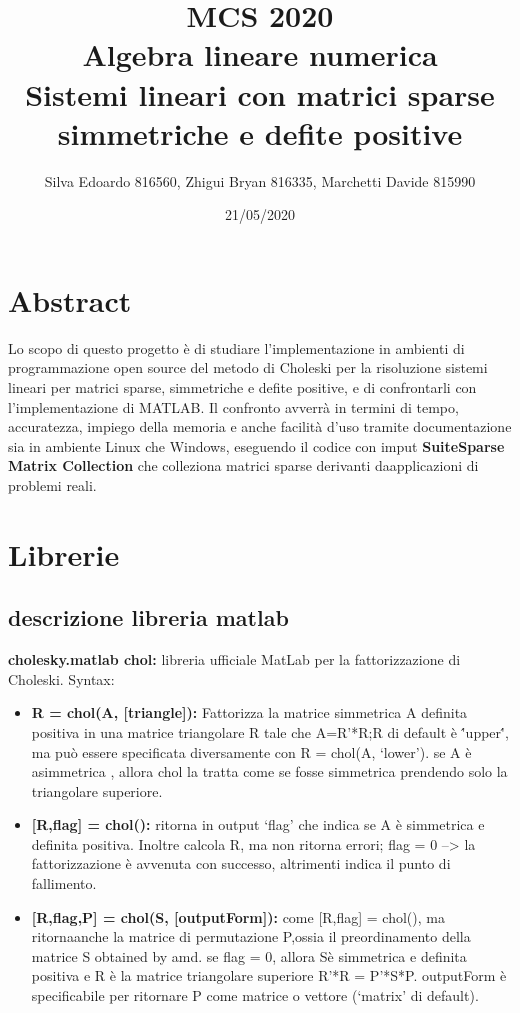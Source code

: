 \documentclass[12pt]{article}
\title{%
  MCS 2020 \\
  \large Algebra lineare numerica \\
  Sistemi lineari con matrici sparse simmetriche e defite positive}
\date{21/05/2020}
\author{Silva Edoardo 816560, Zhigui Bryan 816335, Marchetti Davide 815990}
\begin{document}
\maketitle

\section*{Abstract}

Lo scopo di questo progetto è di studiare l'implementazione in ambienti
di programmazione open source del metodo di Choleski per la risoluzione sistemi lineari
per matrici sparse, simmetriche e defite positive, e di confrontarli con l'implementazione
di MATLAB.\newline
Il confronto avverrà in termini di tempo, accuratezza, impiego della memoria e anche facilità d'uso tramite
documentazione sia in ambiente Linux che Windows, eseguendo il codice con imput \textbf{SuiteSparse Matrix Collection}
che colleziona matrici sparse derivanti daapplicazioni di problemi reali.\newline
\section{Librerie}
	\subsection{descrizione libreria matlab}
	
	\textbf{cholesky.matlab chol:} libreria ufficiale MatLab per la fattorizzazione di Choleski.	\newline
	 \large{Syntax:}
	\begin{itemize}
 		 \item \textbf{R = chol(A, [triangle]):} Fattorizza la matrice simmetrica A definita positiva in una matrice triangolare R tale che A=R'*R;\newline R di default è \''upper\'', ma può essere specificata diversamente con R = chol(A, `lower'). se A è asimmetrica , allora chol la tratta come se fosse simmetrica prendendo solo la triangolare superiore.
 		 \item{\textbf{[R,flag] = chol():} ritorna in output `flag' che indica se A è simmetrica e definita positiva. Inoltre calcola R, ma non ritorna errori; flag = 0 --> la fattorizzazione è avvenuta con successo, altrimenti indica il punto di fallimento.}
 		 \item{\textbf{[R,flag,P] = chol(S, [outputForm]):}  come [R,flag] = chol(), ma ritornaanche la matrice di permutazione P,ossia il preordinamento della matrice S obtained by amd. se flag = 0, allora  Sè simmetrica e definita positiva e R è la matrice triangolare superiore R'*R = P'*S*P.
 		 outputForm è specificabile per ritornare P come matrice o vettore (`matrix' di default).}
	\end{itemize}
\end{document}
